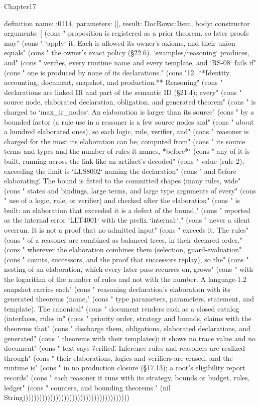 \begin{lexlean}{Chapter17}
\begin{semanticmodule}
definition{
  name: i0114,
  parameters: [],
  result: DocRows::Item,
  body: constructor{
    arguments: [
      (cons "    proposition is registered as a prior theorem, so later proofs may" (cons "    `apply` it. Each is allowed its owner's axioms, and their union equals" (cons "    the owner's exact policy (§22.6). `examples/reasoning` produces, and" (cons "    verifies, every runtime name and every template, and `RS-08` fails if" (cons "    one is produced by none of its declarations." (cons "12. **Identity, accounting, document, snapshot, and production.** Reasoning" (cons "    declarations are linked IR and part of the semantic ID (§21.4); every" (cons "    source node, elaborated declaration, obligation, and generated theorem" (cons "    is charged to `max_ir_nodes`. An elaboration is larger than its source" (cons "    by a bounded factor (a rule use in a reasoner is a few source nodes and" (cons "    about a hundred elaborated ones), so each logic, rule, verifier, and" (cons "    reasoner is charged for the most its elaboration can be, computed from" (cons "    its source terms and types and the number of rules it names, *before*" (cons "    any of it is built, running across the link like an artifact's decoded" (cons "    value (rule 2); exceeding the limit is `LLS8002` naming the declaration" (cons "    and \"before elaborating\". The bound is fitted to the committed shapes (many rules, wide" (cons "    states and bindings, large terms, and large type arguments of every" (cons "    use of a logic, rule, or verifier) and checked after the elaboration" (cons "    is built: an elaboration that exceeded it is a defect of the bound," (cons "    reported as the internal error `LLT4001` with the prefix `internal:`," (cons "    never a silent overrun. It is not a proof that no admitted input" (cons "    exceeds it. The rules" (cons "    of a reasoner are combined as balanced trees, in their declared order," (cons "    wherever the elaboration combines them (selection, guard-evaluation" (cons "    counts, successors, and the proof that successors replay), so the" (cons "    nesting of an elaboration, which every later pass recurses on, grows" (cons "    with the logarithm of the number of rules and not with the number. A language-1.2 snapshot carries each" (cons "    reasoning declaration's elaboration with its generated theorems (name," (cons "    type parameters, parameters, statement, and template). The canonical" (cons "    document renders each as a closed catalog (interfaces, rules in" (cons "    priority order, strategy and bounds, claims with the theorems that" (cons "    discharge them, obligations, elaborated declarations, and generated" (cons "    theorems with their templates); it shows no trace value and no document" (cons "    text says \"verified\". Inference rules and reasoners are realized through" (cons "    their elaborations, logics and verifiers are erased, and the runtime is" (cons "    in no production closure (§17.13); a root's eligibility report records" (cons "    each reasoner it runs with its strategy, bounds or budget, rules, ledger" (cons "    counters, and bounding theorems." (nil String)))))))))))))))))))))))))))))))))))))))
}}
\end{semanticmodule}
\end{lexlean}
